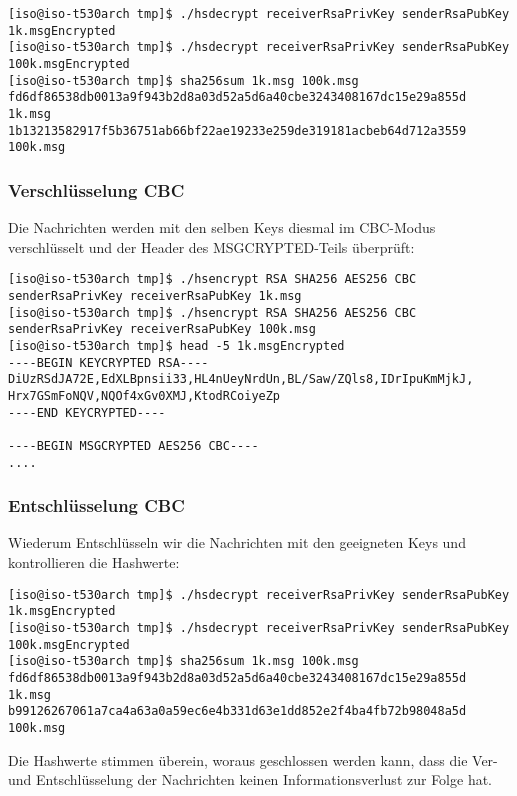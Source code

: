 \begin{lstlisting}
[iso@iso-t530arch tmp]$ ./hsdecrypt receiverRsaPrivKey senderRsaPubKey 1k.msgEncrypted 
[iso@iso-t530arch tmp]$ ./hsdecrypt receiverRsaPrivKey senderRsaPubKey 100k.msgEncrypted 
[iso@iso-t530arch tmp]$ sha256sum 1k.msg 100k.msg
fd6df86538db0013a9f943b2d8a03d52a5d6a40cbe3243408167dc15e29a855d  1k.msg
1b13213582917f5b36751ab66bf22ae19233e259de319181acbeb64d712a3559  100k.msg
\end{lstlisting}

\subsubsection{Verschlüsselung CBC}
Die Nachrichten werden mit den selben Keys diesmal im CBC-Modus verschlüsselt und der Header des MSGCRYPTED-Teils überprüft:

\begin{lstlisting}
[iso@iso-t530arch tmp]$ ./hsencrypt RSA SHA256 AES256 CBC senderRsaPrivKey receiverRsaPubKey 1k.msg 
[iso@iso-t530arch tmp]$ ./hsencrypt RSA SHA256 AES256 CBC senderRsaPrivKey receiverRsaPubKey 100k.msg
[iso@iso-t530arch tmp]$ head -5 1k.msgEncrypted 
----BEGIN KEYCRYPTED RSA----
DiUzRSdJA72E,EdXLBpnsii33,HL4nUeyNrdUn,BL/Saw/ZQls8,IDrIpuKmMjkJ,
Hrx7GSmFoNQV,NQOf4xGv0XMJ,KtodRCoiyeZp
----END KEYCRYPTED----

----BEGIN MSGCRYPTED AES256 CBC----
....
\end{lstlisting}

\subsubsection{Entschlüsselung CBC}
Wiederum Entschlüsseln wir die Nachrichten mit den geeigneten Keys und kontrollieren die Hashwerte:

\begin{lstlisting}
[iso@iso-t530arch tmp]$ ./hsdecrypt receiverRsaPrivKey senderRsaPubKey 1k.msgEncrypted
[iso@iso-t530arch tmp]$ ./hsdecrypt receiverRsaPrivKey senderRsaPubKey 100k.msgEncrypted 
[iso@iso-t530arch tmp]$ sha256sum 1k.msg 100k.msg
fd6df86538db0013a9f943b2d8a03d52a5d6a40cbe3243408167dc15e29a855d  1k.msg
b99126267061a7ca4a63a0a59ec6e4b331d63e1dd852e2f4ba4fb72b98048a5d  100k.msg
\end{lstlisting}

Die Hashwerte stimmen überein, woraus geschlossen werden kann, dass die Ver- und Entschlüsselung der Nachrichten keinen Informationsverlust zur Folge hat.

